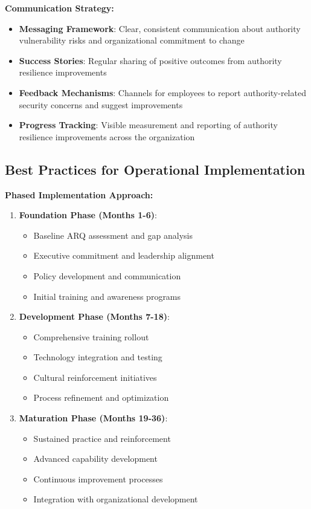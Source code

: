 \documentclass[11pt,a4paper]{article}
\begin{document}
\textbf{Communication Strategy:}
\begin{itemize}
\item \textbf{Messaging Framework}: Clear, consistent communication about authority vulnerability risks and organizational commitment to change
\item \textbf{Success Stories}: Regular sharing of positive outcomes from authority resilience improvements
\item \textbf{Feedback Mechanisms}: Channels for employees to report authority-related security concerns and suggest improvements
\item \textbf{Progress Tracking}: Visible measurement and reporting of authority resilience improvements across the organization
\end{itemize}

\subsection{Best Practices for Operational Implementation}

\textbf{Phased Implementation Approach:}
\begin{enumerate}
\item \textbf{Foundation Phase (Months 1-6)}:
   \begin{itemize}
   \item Baseline ARQ assessment and gap analysis
   \item Executive commitment and leadership alignment
   \item Policy development and communication
   \item Initial training and awareness programs
   \end{itemize}

\item \textbf{Development Phase (Months 7-18)}:
   \begin{itemize}
   \item Comprehensive training rollout
   \item Technology integration and testing
   \item Cultural reinforcement initiatives
   \item Process refinement and optimization
   \end{itemize}

\item \textbf{Maturation Phase (Months 19-36)}:
   \begin{itemize}
   \item Sustained practice and reinforcement
   \item Advanced capability development
   \item Continuous improvement processes
   \item Integration with organizational development
   \end{itemize}
\end{enumerate}
\end{document}
